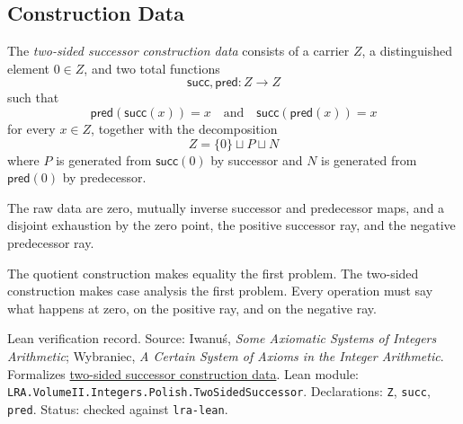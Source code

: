 \subsection*{Construction Data}

\begin{definition}
\label{def:two-sided-successor-construction-data}
The \emph{two-sided successor construction data} consists of a carrier \(Z\),
a distinguished element \(0\in Z\), and two total functions
\[
\mathsf{succ},\mathsf{pred}:Z\to Z
\]
such that
\[
\mathsf{pred}(\mathsf{succ}(x))=x
\quad\text{and}\quad
\mathsf{succ}(\mathsf{pred}(x))=x
\]
for every \(x\in Z\), together with the decomposition
\[
Z=\{0\}\sqcup P\sqcup N
\]
where \(P\) is generated from \(\mathsf{succ}(0)\) by successor and
\(N\) is generated from \(\mathsf{pred}(0)\) by predecessor.
\end{definition}

\begin{remark*}
The raw data are zero, mutually inverse successor and predecessor maps, and a
disjoint exhaustion by the zero point, the positive successor ray, and the
negative predecessor ray.
\end{remark*}

\begin{remark*}[Interpretation]
The quotient construction makes equality the first problem. The two-sided
construction makes case analysis the first problem. Every operation must say
what happens at zero, on the positive ray, and on the negative ray.
\end{remark*}

\begin{remark*}[Exposition]
Lean verification record. Source: Iwanu{\'s}, \emph{Some Axiomatic Systems of
Integers Arithmetic}; Wybraniec, \emph{A Certain System of Axioms in the
Integer Arithmetic}. Formalizes
\hyperref[def:two-sided-successor-construction-data]{two-sided successor
construction data}. Lean module:
\texttt{LRA.VolumeII.Integers.Polish.TwoSidedSuccessor}. Declarations:
\texttt{Z}, \texttt{succ}, \texttt{pred}. Status: checked against
\texttt{lra-lean}.
\end{remark*}

